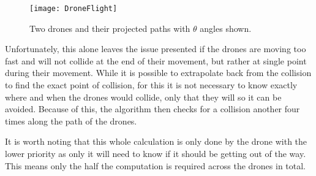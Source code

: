 \begin{figure}
\centering
\texttt{[image: DroneFlight]}
\caption{Two drones and their projected paths with $\theta$ angles shown.}
\label{fig:drone_flight}
\end{figure}

Unfortunately, this alone leaves the issue presented if the drones are moving too fast and will not collide at the end of their movement, but rather at single point during their movement. While it is possible to extrapolate back from the collision to find the exact point of collision, for this it is not necessary to know exactly where and when the drones would collide, only that they will so it can be avoided. Because of this, the algorithm then checks for a collision another four times along the path of the drones.

It is worth noting that this whole calculation is only done by the drone with the lower priority as only it will need to know if it should be getting out of the way. This means only the half the computation is required across the drones in total.